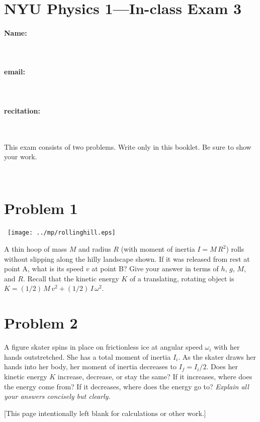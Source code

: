 \documentclass[12pt]{article}
\begin{document}
\section*{NYU Physics 1---In-class Exam 3}

\vfill

\paragraph{Name:} ~

\paragraph{email:} ~

\paragraph{recitation:} ~

\vfill

This exam consists of two problems.  Write only in this booklet.  Be
sure to show your work.

\vfill ~

\clearpage

\section*{Problem 1}

\noindent~\hfill\texttt{[image: ../mp/rollinghill.eps]}\hfill~

A thin hoop of mass $M$ and radius $R$ (with moment of inertia
$I=M\,R^2$) rolls without slipping along the hilly landscape shown.
If it was released from rest at point A, what is its speed $v$ at
point B?  Give your answer in terms of $h$, $g$, $M$, and $R$.  Recall
that the kinetic energy $K$ of a translating, rotating object is
$K=(1/2)\,M\,v^2+(1/2)\,I\,\omega^2$.

\clearpage

\section*{Problem 2}

A figure skater spins in place on frictionless ice at angular speed
$\omega_i$ with her hands outstretched.  She has a total moment of
inertia $I_i$.  As the skater draws her hands into her body, her
moment of inertia decreases to $I_f=I_i/2$.  Does her kinetic energy
$K$ increase, decrease, or stay the same?  If it increases, where does
the energy come from?  If it decreases, where does the energy go to?
\emph{Explain all your answers concisely but clearly.}

\clearpage

[This page intentionally left blank for calculations or other work.]
\end{document}
